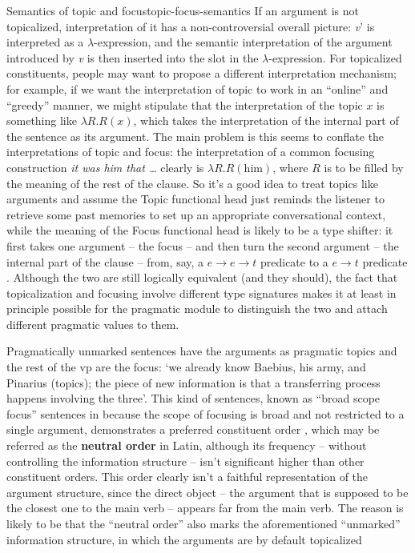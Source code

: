 \documentclass[a4paper, oneside]{report}
\newcommand*{\citepage}[1]{p.~{#1}}
\newcommand*{\citepages}[1]{pp.~{#1}}
\newcommand*{\concept}[1]{\textbf{#1}}
\newcommand{\form}[1]{\emph{#1}}
\newcommand{\translate}[1]{`#1'}
\begin{document}
\begin{theorybox}{Semantics of topic and focus}{topic-focus-semantics}
    If an argument is not topicalized, 
    interpretation of it has a non-controversial overall picture: 
    \textit{v}' is interpreted as a $\lambda$-expression,
    and the semantic interpretation of the argument introduced by \textit{v}
    is then inserted into the slot in the $\lambda$-expression.
    For topicalized constituents, 
    people may want to propose a different interpretation mechanism;
    for example, if we want the interpretation of topic 
    to work in an ``online'' and ``greedy'' manner,
    we might stipulate that the interpretation of the topic $x$ 
    is something like $\lambda R . R(x)$,
    which takes the interpretation of the internal part of the sentence 
    as its argument.
    The main problem is this seems to conflate the interpretations of topic and focus:     
    the interpretation of a common focusing construction 
    \form{it was him that \dots}
    clearly is $\lambda R . R(\text{him})$, 
    where $R$ is to be filled by the meaning of the rest of the clause.
    So it's a good idea to treat topics like arguments
    and assume the Topic functional head just reminds the listener 
    to retrieve some past memories to set up an appropriate conversational context, 
    while the meaning of the Focus functional head 
    is likely to be a type shifter: 
    it first takes one argument -- the focus -- 
    and then turn the second argument -- the internal part of the clause -- 
    from, say, a $e \to e \to t$ predicate to a $e \to t$ predicate 
    \citep[\citepages{90-91}]{devine2006latin}. 
    Although the two are still logically equivalent (and they should),
    the fact that topicalization and focusing involve 
    different type signatures 
    makes it at least in principle possible 
    for the pragmatic module to 
    distinguish the two and 
    attach different pragmatic values to them.
\end{theorybox}

Pragmatically unmarked sentences have the arguments as pragmatic topics 
and the rest of the \acs{vp} are the focus:
\translate{we already know Baebius, his army, and Pinarius (topics);
the piece of new information is that 
a transferring process happens involving the three}.
This kind of sentences, known as ``broad scope focus'' sentences 
in \citet[\citepage{15}]{devine2006latin}
because the scope of focusing is broad
and not restricted to a single argument,
demonstrates a preferred constituent order 
\citep[\citepage{79}]{devine2006latin},
which may be referred as the \concept{neutral order} in Latin,
although its frequency -- without controlling the information structure -- 
isn't significant higher than other constituent orders.
This order clearly isn't a faithful representation 
of the argument structure, 
since the direct object -- the argument that is supposed to be the closest one to the main verb -- 
appears far from the main verb. 
The reason is likely to be that the ``neutral order'' also marks 
the aforementioned ``unmarked'' information structure, 
in which the arguments are by default topicalized 
\end{document}
